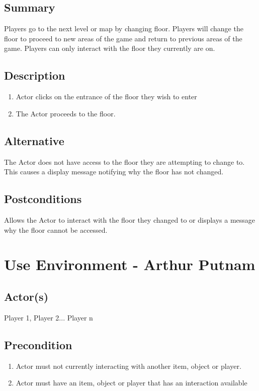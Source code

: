 \documentclass[11pt]{article}
\begin{document}
		\subsection{Summary}
		Players go to the next level or map by changing floor. Players will change the floor to proceed to new areas of the game and return to previous areas of the game. Players can only interact with the floor they currently are on.
		\subsection{Description}
			\begin{enumerate}
			\item Actor clicks on the entrance of the floor they wish to enter
			\item The Actor proceeds to the floor.
			\end{enumerate}

		\subsection{Alternative}
			The Actor does not have access to the floor they are attempting to change to. This causes a display message notifying why the floor has not changed.
		
		\subsection{Postconditions}	
		Allows the Actor to interact with the floor they changed to or displays a message why the floor cannot be accessed. 	



 \maketitle

    \section{Use Environment - Arthur Putnam}
	

		\subsection{Actor(s)}
		Player 1, Player 2... Player n
			

		\subsection{Precondition}
		\begin{enumerate}
		\item Actor must not currently interacting with another item, object or player.
        \item Actor must have an item, object or player that has an interaction available 
		\end{enumerate}
	
\end{document}
